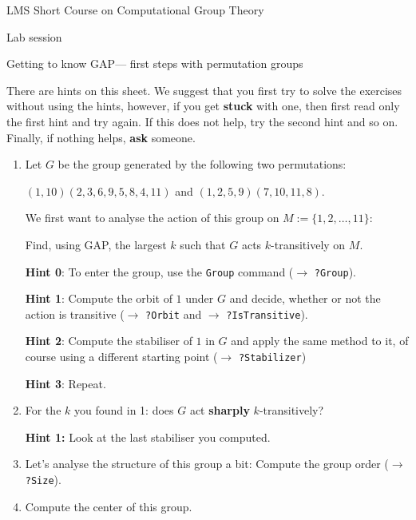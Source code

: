 \documentclass[12pt]{article}
\newcommand{\GAP}{\textsf{GAP}}
\begin{document}
\begin{center}
\large LMS Short Course on Computational Group Theory

\Large Lab session

\large Getting to know \GAP --- first steps with permutation groups
\end{center}

{\small
There are hints on
this sheet. We suggest that you first try to solve the exercises without
using the hints, however, if you get \textbf{stuck} with one, then first
read only the first hint and try again. If this does not help, try the
second hint and so on. Finally, if nothing helps, \textbf{ask} someone.}

\begin{enumerate}
\setlength{\parskip}{0pt}
\item Let $G$ be the group generated by the following two permutations:

\begin{center}{\small
$(1,10)(2,3,6,9,5,8,4,11)$ and $(1,2,5,9)(7,10,11,8)$.}
\end{center}

We first want to analyse the action of this group on $M := \{1,2,\ldots,11\}$:

Find, using \GAP, the largest $k$ such that $G$ acts $k$-transitively
on $M$.

\smallskip
\textbf{Hint 0}: To enter the group, use the \texttt{Group} command ($\to$
\texttt{?Group}).

\smallskip
\textbf{Hint 1}: Compute the orbit of $1$ under $G$ and decide, whether or
not the action is transitive ($\to$ \texttt{?Orbit} and
$\to$ \texttt{?IsTransitive}).

\smallskip
\textbf{Hint 2}: Compute the stabiliser of $1$ in $G$ and apply the same
method to it, of course using a different starting point
($\to$ \texttt{?Stabilizer})

\smallskip
\textbf{Hint 3}: Repeat.
\item For the $k$ you found in 1: does $G$ act \textbf{sharply}
$k$-transitively?

\smallskip
\textbf{Hint 1:} Look at the last stabiliser you computed.
\item Let's analyse the structure of this group a bit:
Compute the group order ($\to$ \texttt{?Size}).
\item Compute the center of this group.


\end{enumerate}
\end{document}
